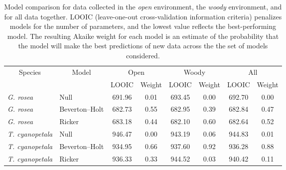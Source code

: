 \begin{table}[h]
\caption{Model comparison for data collected in the \emph{open} environment, the \emph{woody} environment, and for all data together. LOOIC (leave-one-out cross-validation information criteria) penalizes models for the number of parameters, and the lowest value reflects the best-performing model. The resulting Akaike weight for each model is an estimate of the probability that the model will make the best predictions of new data across the the set of models considered.\label{tab:compare}} 
\begin{center}
\begin{tabular}{llcccccc}
\hline\hline
\multicolumn{1}{c}{\multirow{2}{*}{Species}}&\multicolumn{1}{c}{\multirow{2}{*}{Model}}&\multicolumn{2}{c}{Open}&\multicolumn{2}{c}{Woody}&\multicolumn{2}{c}{All}\\
& &\multicolumn{1}{c}{LOOIC}&\multicolumn{1}{c}{Weight}&\multicolumn{1}{c}{LOOIC}&\multicolumn{1}{c}{Weight}&\multicolumn{1}{c}{LOOIC}&\multicolumn{1}{c}{Weight}\tabularnewline
\hline
\emph{G. rosea}&Null&691.96&0.01&693.45&0.00&692.70&0.00\tabularnewline
\emph{G. rosea}&Beverton--Holt&682.73&0.55&682.95&0.39&682.84&0.47\tabularnewline
\emph{G. rosea}&Ricker&683.18&0.44&682.10&0.60&682.64&0.52\tabularnewline
\emph{T. cyanopetala}&Null&946.47&0.00&943.19&0.06&944.83&0.01\tabularnewline
\emph{T. cyanopetala}&Beverton--Holt&934.95&0.66&937.60&0.92&936.28&0.88\tabularnewline
\emph{T. cyanopetala}&Ricker&936.33&0.33&944.52&0.03&940.42&0.11\tabularnewline
\hline
\end{tabular}\end{center}
\end{table}
